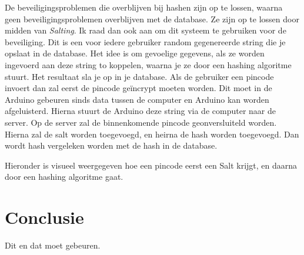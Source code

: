 \documentclass{article}
\begin{document}
De beveiligingsproblemen die overblijven bij hashen zijn op te lossen, waarna geen beveiligingsproblemen overblijven met de database.
Ze zijn op te lossen door midden van \emph{Salting}.
Ik raad dan ook aan om dit systeem te gebruiken voor de beveiliging.
Dit is een voor iedere gebruiker random gegenereerde string die je opslaat in de database.
Het idee is om gevoelige gegevens, als ze worden ingevoerd aan deze string to koppelen, waarna je ze door een hashing algoritme stuurt.
Het resultaat sla je op in je database.
Als de gebruiker een pincode invoert dan zal eerst de pincode ge\"incrypt moeten worden.
Dit moet in de Arduino gebeuren sinds data tussen de computer en Arduino kan worden afgeluisterd.
Hierna stuurt de Arduino deze string via de computer naar de server.
Op de server zal de binnenkomende pincode geonversluiteld worden.
Hierna zal de salt worden toegevoegd, en heirna de hash worden toegevoegd.
Dan wordt hash vergeleken worden met de hash in de database.

Hieronder is visueel weergegeven hoe een pincode eerst een Salt krijgt, en daarna door een hashing algoritme gaat.

\hfill

\centerline{  }

\section{Conclusie}

Dit en dat moet gebeuren.
\end{document}
